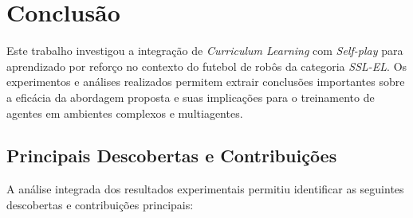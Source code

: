 \chapter{Conclusão}
\label{cap:conclusao}

Este trabalho investigou a integração de \textit{Curriculum Learning} com \textit{Self-play} para aprendizado por reforço no contexto do futebol de robôs da categoria \textit{SSL-EL}. Os experimentos e análises realizados permitem extrair conclusões importantes sobre a eficácia da abordagem proposta e suas implicações para o treinamento de agentes em ambientes complexos e multiagentes.

\section{Principais Descobertas e Contribuições}

A análise integrada dos resultados experimentais permitiu identificar as seguintes descobertas e contribuições principais:

